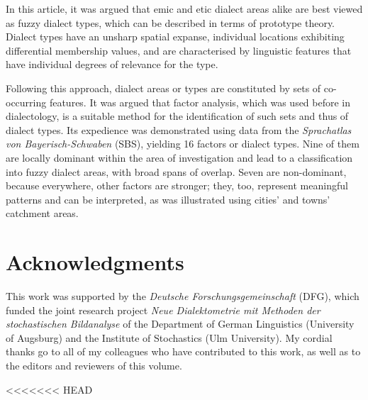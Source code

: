 \documentclass[output=paper]{LSP/langsci}
\begin{document}
In this article, it was argued that emic and etic dialect areas alike are best viewed as fuzzy dialect types, which can be described in terms of prototype theory. Dialect types have an unsharp spatial expanse, individual locations exhibiting differential membership values, and are characterised by linguistic features that have individual degrees of relevance for the type.

Following this approach, dialect areas or types are constituted by sets of co-occurring features. It was argued that factor analysis, which was used before in dialectology, is a suitable method for the identification of such sets and thus of dialect types. Its expedience was demonstrated using data from the \textit{Sprachatlas von Bayerisch-Schwaben} (SBS), yielding 16 factors or dialect types. Nine of them are locally dominant within the area of investigation and lead to a classification into fuzzy dialect areas, with broad spans of overlap. Seven are non-dominant, because everywhere, other factors are stronger; they, too, represent meaningful patterns and can be interpreted, as was illustrated using cities’ and towns’ catchment areas.

\section*{Acknowledgments}

This work was supported by the \textit{Deutsche Forschungsgemeinschaft} (DFG), which funded the joint research project \textit{Neue Dialektometrie mit Methoden der stochastischen Bildanalyse} of the Department of German Linguistics (University of Augsburg) and the Institute of Stochastics (Ulm University). My cordial thanks go to all of my colleagues who have contributed to this work, as well as to the editors and reviewers of this volume.

\printbibliography[heading=subbibliography,notkeyword=this]
<<<<<<< HEAD
\end{document}
